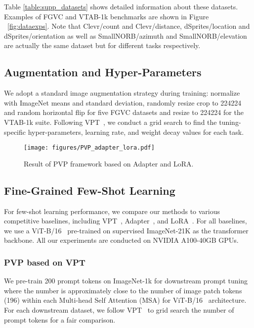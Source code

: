 \documentclass[10pt,journal,letterpaper,compsoc]{IEEEtran}
\begin{document}
Table \ref{table:supp_datasets} shows detailed information about these datasets. Examples of FGVC and VTAB-1k benchmarks are shown in Figure ~\ref{fig:dataexps}. Note that Clevr/count and Clevr/distance, dSprites/location and dSprites/orientation as well as SmallNORB/azimuth and SmallNORB/elevation are actually the same dataset but for different tasks respectively.

\subsection{Augmentation and Hyper-Parameters}
We adopt a standard image augmentation strategy during training: normalize with ImageNet means and standard deviation, randomly resize crop to 224224 and random horizontal flip for five FGVC datasets and resize to 224224 for the VTAB-1k suite. 
Following VPT~\cite{vpt}, we conduct a grid search to find the tuning-specific hyper-parameters, learning rate, and weight decay values for each task.


\begin{figure*}[h]
    \centering
    \texttt{[image: figures/PVP\_adapter\_lora.pdf]}
    \caption{Result of PVP framework based on Adapter and LoRA.}
    \label{fig:other_prompt}
\end{figure*}



\subsection{Fine-Grained Few-Shot Learning}
For few-shot learning performance, we compare our methods to various competitive baselines, including VPT~\cite{vpt}, Adapter~\cite{adapter}, and LoRA~\cite{Lora}. For all baselines, we use a ViT-B/16~\cite{vit} pre-trained on supervised ImageNet-21K as the transformer backbone. All our experiments are conducted on NVIDIA A100-40GB GPUs.

\subsubsection{PVP based on VPT}
 We pre-train 200 prompt tokens on ImageNet-1k for downstream prompt tuning where the number is approximately close to the number of image
patch tokens (196) within each Multi-head Self Attention (MSA) for ViT-B/16~\cite{vit} architecture. For each downstream dataset, we follow VPT~\cite{vpt} to grid search the number of prompt tokens for a fair comparison. 
\end{document}
